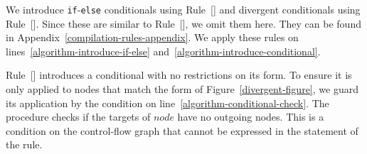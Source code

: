 We introduce \texttt{if}-\texttt{else} conditionals using
Rule~[] and divergent conditionals
using Rule~[].
Since these are similar to Rule~[], we
omit them here.
They can be found in Appendix~\ref{compilation-rules-appendix}.
We apply these rules on lines~\ref{algorithm-introduce-if-else}
and~\ref{algorithm-introduce-conditional}.

Rule~[] introduces a
conditional with no restrictions on its form.
To ensure it is only applied to nodes that match the form of
Figure~\ref{divergent-figure}, we guard its application by the
condition  on
line~\ref{algorithm-conditional-check}.
The procedure  checks if the targets
of $node$ have no outgoing nodes.
This is a condition on the control-flow graph that cannot be expressed
in the statement of the rule.

